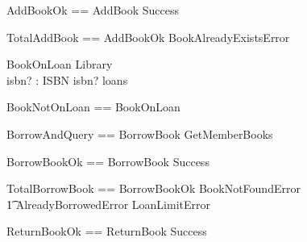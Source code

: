 \documentclass{article}
\begin{document}
\begin{zed}
  AddBookOk == AddBook \land Success
\end{zed}

\begin{zed}
  TotalAddBook == AddBookOk \lor BookAlreadyExistsError
\end{zed}

\begin{schema}{BookOnLoan}
  Library \\
  isbn? : ISBN
\where
  isbn? \in \dom loans
\end{schema}

\begin{zed}
  BookNotOnLoan == \lnot BookOnLoan
\end{zed}

\begin{zed}
  BorrowAndQuery == BorrowBook \semi GetMemberBooks
\end{zed}

\begin{zed}
  BorrowBookOk == BorrowBook \land Success
\end{zed}

\begin{zed}
  TotalBorrowBook == BorrowBookOk \lor BookNotFoundError \\
    \t1 \lor AlreadyBorrowedError \lor LoanLimitError
\end{zed}

\begin{zed}
  ReturnBookOk == ReturnBook \land Success
\end{zed}
\end{document}
